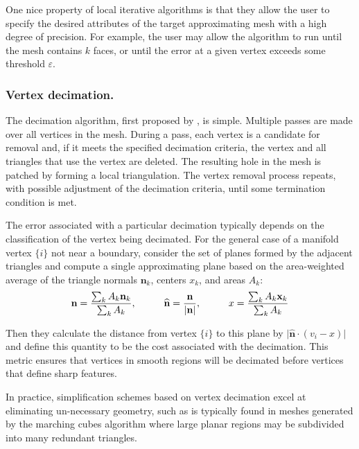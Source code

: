 One nice property of local iterative algorithms is that they allow the user to specify the desired attributes of the target approximating mesh with a high degree of precision. For example, the user may allow the algorithm to run until the mesh contains $k$ faces, or until the error at a given vertex exceeds some threshold $\varepsilon$. 

\subsubsection*{Vertex decimation.}
The decimation algorithm, first proposed by \cite{Schroeder92}, is simple. Multiple passes are made over all vertices in the mesh. During a pass, each vertex is a candidate for removal and, if it meets the specified decimation criteria, the vertex and all triangles that use the vertex are deleted. The resulting hole in the mesh is patched by forming a local triangulation. The vertex removal process repeats, with possible adjustment of the decimation criteria, until some termination condition is met. 

The error associated with a particular decimation typically depends on the classification of the vertex being decimated. For the general case of a manifold vertex $\lbrace i \rbrace$ not near a boundary, \citeauthor{Schroeder92} consider the set of planes formed by the adjacent triangles and compute a single approximating plane based on the area-weighted average of the triangle normals $\textbf{n}_k$, centers $x_k$, and areas $A_k$:
%
\begin{equation}
\textbf{n} = \frac{\sum_k A_k\textbf{n}_k}{\sum_k A_k},  \hspace*{1cm} \widehat{\textbf{n}} = \frac{\textbf{n}}{\vert \textbf{n} \vert}, \hspace*{1cm}  x = \frac{\sum_k A_k\textbf{x}_k}{\sum_k A_k}
\end{equation}

Then they calculate the distance from vertex $\lbrace i \rbrace$ to this plane by  $\vert \widehat{\textbf{n}} \cdot (v_i - x) \vert$ and define this quantity to be the cost associated with the decimation. This metric ensures that vertices in smooth regions will be decimated before vertices that define sharp features. 

In practice, simplification schemes based on vertex decimation excel at eliminating un-necessary geometry, such as is typically found in meshes generated by the marching cubes algorithm where large planar regions may be subdivided into many redundant triangles. 

